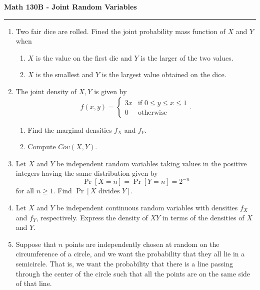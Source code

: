 \documentclass[11pt,letterpaper]{article}
\begin{document}
\begin{center}
{\bf \Large Math 130B - Joint Random Variables}
\vspace{0.2cm}
\hrule
\end{center}

\begin{enumerate}
	\item Two fair dice are rolled. Fined the joint probability mass function of $X$ and $Y$ when
	\begin{enumerate}
		\item $X$ is the value on the first die and $Y$ is the larger of the two values.
		\item $X$ is the smallest and $Y$ is the largest value obtained on the dice.
	\end{enumerate}

	\vfill

	\item The joint density of $X,Y$ is given by
	\[
		f(x,y) = \begin{cases}
			3x &\text{if }0\leq y \leq x \leq 1\\
			0 & \text{otherwise}
		\end{cases}.
	\]
	\begin{enumerate}
		\item Find the marginal densities $f_X$ and $f_Y$.

		\item Compute $Cov(X,Y)$.
	\end{enumerate}

	\vfill

	\item Let $X$ and $Y$ be independent random variables taking values in the positive integers having the same distribution given by
	\[
		\Pr[X=n] = \Pr[Y=n] = 2^{-n}
	\]
	for all $n \geq 1$. Find $\Pr[X \text{ divides }Y]$.

	\vfill

	\item Let $X$ and $Y$ be independent continuous random variables with densities $f_X$ and $f_Y$, respectively. Express the density of $XY$ in terms of the densities of $X$ and $Y$.

	\vfill

	\item Suppose that $n$ points are independently chosen at random on the circumference of a circle, and we want the probability that they all lie in a semicircle. That is, we want the probability that there is a line passing through the center of the circle such that all the points are on the same side of that line.


\end{enumerate}
\end{document}

